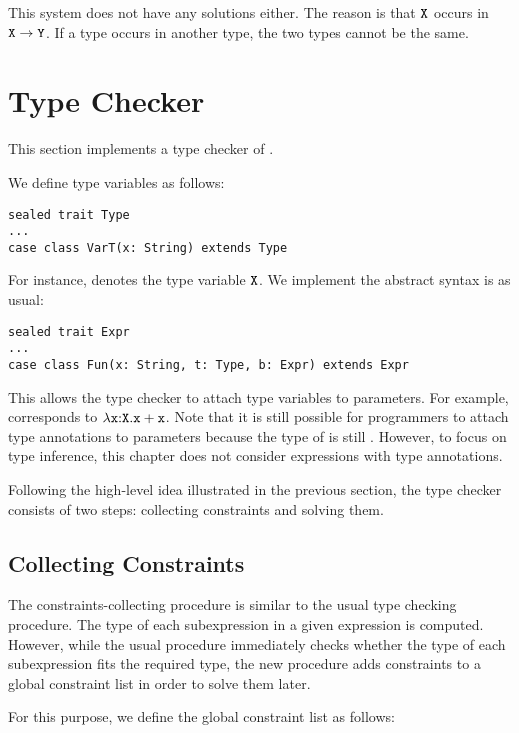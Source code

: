This system does not have any solutions either. The reason is that $\texttt{X}$ occurs
in $\texttt{X}\rightarrow\texttt{Y}$. If a type occurs in another type, the two types cannot
be the same.

\section{Type Checker}

This section implements a type checker of \lang.

We define type variables as follows:

\begin{verbatim}
sealed trait Type
...
case class VarT(x: String) extends Type
\end{verbatim}

For instance,  denotes the type variable $\texttt{X}$.
We implement the abstract syntax is as usual:

\begin{verbatim}
sealed trait Expr
...
case class Fun(x: String, t: Type, b: Expr) extends Expr
\end{verbatim}

This allows the type checker to attach type variables to parameters.  For
example,  corresponds to
$\lambda\texttt{x}{:}\texttt{X}.\texttt{x}+\texttt{x}$. Note that it is still possible for
programmers to attach type annotations to parameters because the type of
 is still . However, to focus on type inference, this chapter
does not consider expressions with type annotations.

Following the high-level idea illustrated in the previous section, the type
checker consists of two steps: collecting constraints and solving them.

\subsection{Collecting Constraints}

The constraints-collecting procedure is similar to the usual type checking
procedure. The type of each subexpression in a given expression is computed.
However, while the usual procedure immediately checks whether the type of each
subexpression fits the required type, the new procedure adds constraints to a
global constraint list in order to solve them later.

For this purpose, we define the global constraint list as follows:

